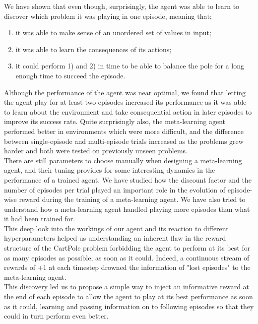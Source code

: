 We have shown that even though, surprisingly, the agent was able to learn
to discover which problem it was playing in one episode, meaning that:
\begin{enumerate}
	\item it was able to make sense of an unordered set of values in input;
	\item it was able to learn the consequences of its actions;
	\item it could perform 1) and 2) in time to be able to balance the
		pole for a long enough time to succeed the episode.
\end{enumerate}
Although the performance of the agent was near optimal, we found that letting
the agent play for at least two episodes increased its performance as it
was able to learn about the environment and take consequential action in
later episodes to improve its success rate. Quite surprisingly also,
the meta-learning agent performed better in environments which were more
difficult, and the difference between single-episode and multi-episode trials
increased as the problems grew harder and both were tested on previously unseen
problems.\\

There are still parameters to choose manually when designing a meta-learning
agent, and their tuning provides for some interesting dynamics in the 
performance of a trained agent. We have studied how the discount factor
and the number of episodes per trial
played an important role in the evolution of episode-wise reward during the 
training of a meta-learning agent.
We have also tried to understand how a meta-learning agent handled playing
more episodes than what it had been trained for.\\

This deep look into the workings of our agent and its reaction to different
hyperparameters helped us understanding an inherent flaw in the reward structure
of the CartPole problem forbidding the agent to perform at its best for
as many episodes as possible, as soon as it could. Indeed, a continuous
stream of rewards of +1 at each timestep drowned the information of "lost
episodes" to the meta-learning agent.\\

This discovery led us to propose a simple way to inject an informative reward
at the end of each episode to allow the agent to play at its best performance
as soon as it could, learning and passing information on to following episodes
so that they could in turn perform even better.\\

